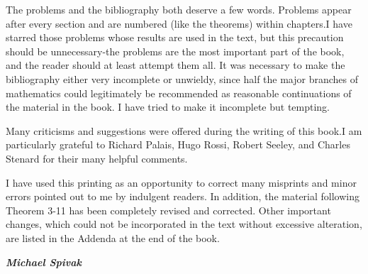 The problems and the bibliography both deserve a few words. 
Problems appear after every section and are 
numbered (like the theorems) within chapters.I have starred
those problems whose results are used in the text, but this
precaution should be unnecessary-the problems are the most
important part of the book, and the reader should at least
attempt them all. It was necessary to make the bibliography
either very incomplete or unwieldy, since half the major 
branches of mathematics could legitimately be recommended
as reasonable continuations of the material in the book.
I have tried to make it incomplete but tempting.

Many criticisms and suggestions were offered during the
writing of this book.I am particularly grateful to Richard
Palais, Hugo Rossi, Robert Seeley, and Charles Stenard for
their many helpful comments.

I have used this printing as an opportunity to correct many
misprints and minor errors pointed out to me by indulgent
readers. In addition, the material following Theorem 3-11
has been completely revised and corrected. Other important
changes, which could not be incorporated in the text without
excessive alteration, are listed in the Addenda at the end of the
book.

\vspace*{1em}
\hspace*{\fill}\textbf{\itshape Michael Spivak}\par 
{}\par 
{}\par 

\newpage


